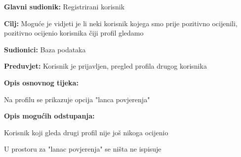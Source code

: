 \noindent {}
\begin{packed_item}
	\item \textbf{Glavni sudionik: } Registrirani korisnik
	\item  \textbf{Cilj:} Moguće je vidjeti je li neki korisnik kojega smo prije pozitivno ocijenili, pozitivno ocijenio korisnika čiji profil gledamo 
	\item  \textbf{Sudionici:} Baza podataka
	\item  \textbf{Preduvjet:} Korisnik je prijavljen, pregled profila drugog korisnika
	\item  \textbf{Opis osnovnog tijeka:}
	\item[] \begin{packed_enum}
		\item Na profilu se prikazuje opcija "lanca povjerenja"
	\end{packed_enum}
	\item  \textbf{Opis mogućih odstupanja:}
	\item[] \begin{packed_item}
		\item[1.a] Korisnik koji gleda drugi profil nije još nikoga ocijenio
		\item[] \begin{packed_enum}
			\item U prostoru za "lanac povjerenja" se ništa ne ispisuje
		\end{packed_enum}
	\end{packed_item}
\end{packed_item}

